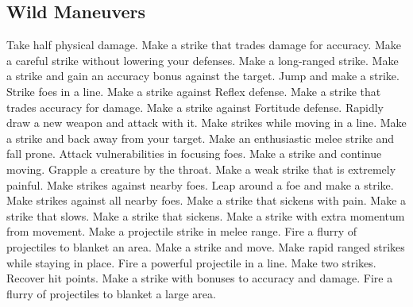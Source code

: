 \subsection{Wild Maneuvers}\label{Wild Maneuvers}
\begin{spelllist}
 Take half physical damage.
 Make a strike that trades damage for accuracy.
 Make a careful strike without lowering your defenses.
 Make a long-ranged strike.
 Make a strike and gain an accuracy bonus against the target.
 Jump and make a strike.
 Strike foes in a line.
 Make a strike against Reflex defense.
 Make a strike that trades accuracy for damage.
 Make a strike against Fortitude defense.
 Rapidly draw a new weapon and attack with it.
 Make strikes while moving in a line.
 Make a strike and back away from your target.
 Make an enthusiastic melee strike and fall prone.
 Attack vulnerabilities in focusing foes.
 Make a strike and continue moving.
 Grapple a creature by the throat.
 Make a weak strike that is extremely painful.
 Make strikes against nearby foes.
 Leap around a foe and make a strike.
 Make strikes against all nearby foes.
 Make a strike that sickens with pain.
 Make a strike that slows.
 Make a strike that sickens.
 Make a strike with extra momentum from movement.
 Make a projectile strike in melee range.
 Fire a flurry of projectiles to blanket an area.
 Make a strike and move.
 Make rapid ranged strikes while staying in place.
 Fire a powerful projectile in a line.
 Make two strikes.
 Recover hit points.
 Make a strike with bonuses to accuracy and damage.
 Fire a flurry of projectiles to blanket a large area.
\end{spelllist}
